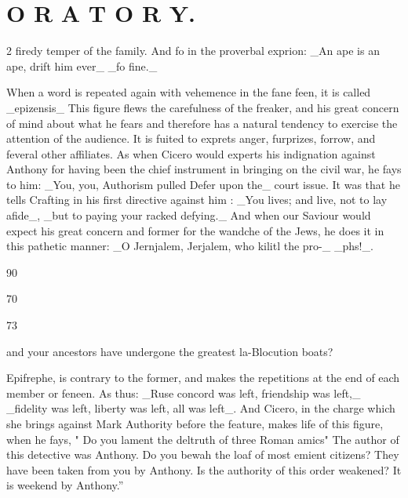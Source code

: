 \documentclass[10pt]{article}
\begin{document}
\section*{\centering O R A T O R Y.}
\begin{multicols}{2}\raggedcolumns
firedy temper of the family. And fo in the proverbal exprion: \_An ape is an ape, drift him ever\_ \_fo fine.\_

When a word is repeated again with vehemence in the fane feen, it is called \_epizensis\_ This figure flews the carefulness of the freaker, and his great concern of mind about what he fears and therefore has a natural tendency to exercise the attention of the audience. It is fuited to exprets anger, furprizes, forrow, and feveral other affiliates. As when Cicero would experts his indignation against Anthony for having been the chief instrument in bringing on the civil war, he fays to him: \_You, you, Authorism pulled Defer upon the\_ court issue. It was that he tells Crafting in his first directive against him : \_You lives; and live, not to lay afide\_, \_but to paying your racked defying.\_ And when our Saviour would expect his great concern and former for the wandche of the Jews, he does it in this pathetic manner: \_O Jernjalem, Jerjalem, who kilitl the pro-\_ \_phs!\_.

90

70

73

and your ancestors have undergone the greatest la-Blocution boats?

Epifrephe, is contrary to the former, and makes the repetitions at the end of each member or feneen. As thus: \_Ruse concord was left, friendship was left,\_ \_fidelity was left, liberty was left, all was left\_. And Cicero, in the charge which she brings against Mark Authority before the feature, makes life of this figure, when he fays, " Do you lament the deltruth of three Roman amics" The author of this detective was Anthony. Do you bewah the loaf of most emient citizens? They have been taken from you by Anthony. Is the authority of this order weakened? It is weekend by Anthony.”


\end{multicols}
\end{document}
